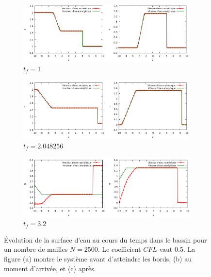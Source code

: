 \documentclass[
	french,
	11pt, %
]{fphw}
\begin{document}
\begin{figure}[H]
	\centering
	\begin{subfigure}[b]{0.9\textwidth}
		\centering
		\includegraphics[width=\textwidth]{PiscineBornee7.png}
		\caption{$t_{f}=1$}
		\label{fig:Piscine3A}
	\end{subfigure}
	\begin{subfigure}[b]{0.9\textwidth}
		\centering
		\includegraphics[width=\textwidth]{PiscineBornee8.png}
		\caption{$t_{f}=2.048256$}
		\label{fig:Piscine3B}
	\end{subfigure}
	\begin{subfigure}[b]{0.9\textwidth}
		\centering
		\includegraphics[width=\textwidth]{PiscineBornee9.png}
		\caption{$t_{f}=3.2$}
		\label{fig:Piscine3C}
	\end{subfigure}
	\caption{Évolution de la surface d'eau au cours du temps dans le bassin pour un nombre de mailles $N=2500$. Le coefficient $CFL$ vaut $0.5$. La figure (a) montre le système avant d'atteindre les bords, (b) au moment d'arrivée, et (c) après.}
	\label{fig:Piscine3}
\end{figure}
\end{document}
